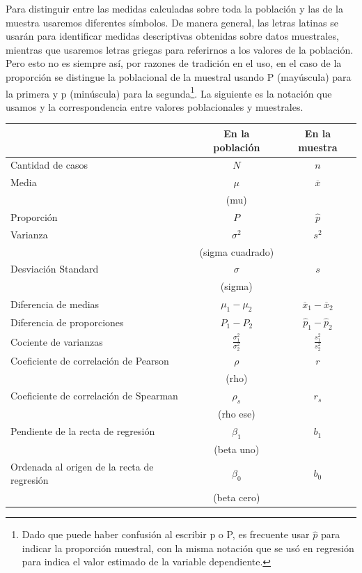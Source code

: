 \documentclass[]{book}
\let\rmarkdownfootnote\footnote%
\def\footnote{\protect\rmarkdownfootnote}
\begin{document}
Para distinguir entre las medidas calculadas sobre toda la población y
las de la muestra usaremos diferentes símbolos. De manera general, las
letras latinas se usarán para identificar medidas descriptivas obtenidas
sobre datos muestrales, mientras que usaremos letras griegas para
referirnos a los valores de la población. Pero esto no es siempre así,
por razones de tradición en el uso, en el caso de la proporción se
distingue la poblacional de la muestral usando P (mayúscula) para la
primera y p (minúscula) para la segunda\footnote{Dado que puede haber confusión al escribir p o P, es frecuente usar \(\widehat{p}\) para indicar la proporción muestral, con la misma notación que se usó en regresión para indica el valor estimado de la variable dependiente.}. La siguiente es la
notación que usamos y la correspondencia entre valores poblacionales y
muestrales.

\begin{table}[H]
\centering
\begin{tabular}{lcc}
\toprule
  & En la población & En la muestra\\
\midrule
\rowcolor{gray!6}  Cantidad de casos & $N$ & $n$\\
Media & $\mu$ & $\overline{x}$\\
\rowcolor{gray!6}   & (mu) & \\
Proporción & $P$ & $\widehat{p}$\\
\rowcolor{gray!6}  Varianza & $\sigma^{2}$ & $s^2$\\
\addlinespace
 & (sigma cuadrado) & \\
\rowcolor{gray!6}  Desviación Standard & $\sigma$ & $s$\\
 & (sigma) & \\
\rowcolor{gray!6}  Diferencia de medias & $\mu_{1} - \mu_{2}$ & ${\overline{x}}_{1} - {\overline{x}}_{2}$\\
Diferencia de proporciones & $P_{1} - P_{2}$ & ${\widehat{p}}_{1} - {\widehat{p}}_{2}$\\
\addlinespace
\rowcolor{gray!6}  Cociente de varianzas & $\frac{\sigma_{1}^{2}}{\sigma_{2}^{2}}$ & $\frac{s_{1}^{2}}{s_{2}^{2}}$\\
Coeficiente de correlación de Pearson & $\rho$ & $r$\\
\rowcolor{gray!6}   & (rho) & \\
Coeficiente de correlación de Spearman & $\rho_{s}$ & $r_s$\\
\rowcolor{gray!6}   & (rho ese) & \\
\addlinespace
Pendiente de la recta de regresión & $\beta_{1}$ & $b_1$\\
\rowcolor{gray!6}   & (beta uno) & \\
Ordenada al origen de la recta de regresión & $\beta_{0}$ & $b_0$\\
\rowcolor{gray!6}   & (beta cero) & \\
\bottomrule
\end{tabular}
\end{table}
\end{document}
